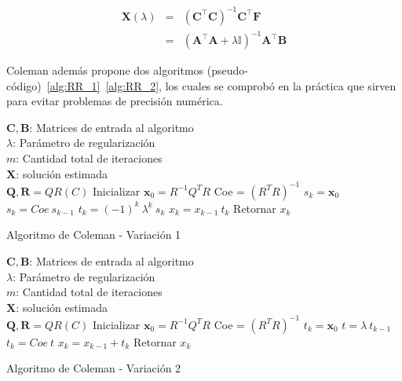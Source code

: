 \begin{eqnarray*}
\mathbf{X}(\lambda)&=&(\mathbf{C}^\top
\mathbf{C})^{-1}\mathbf{C}^\top \mathbf{F} \\
&=& (\mathbf{A}^\top \mathbf{A} + \lambda \mathbb{I})^{-1} \mathbf{A}^\top \mathbf{B}
\end{eqnarray*}

Coleman además propone dos algoritmos
(pseudo-código)~\ref{alg:RR_1}~\ref{alg:RR_2}, los cuales se comprobó en la
práctica que sirven para evitar problemas de precisión numérica.

\begin{algorithm}[H]
\begin{algorithmic}[1]
\REQUIRE $\,$ \\
$\mathbf{C},\mathbf{B}$: Matrices de entrada al algoritmo \\
$\lambda$: Parámetro de regularización \\
$m$: Cantidad total de iteraciones \\
\ENSURE $\,$\\
$\mathbf{X}$: solución estimada \\
\STATE $\mathbf{Q}, \mathbf{R} = QR(C)$
\STATE Inicializar $\mathbf{x}_0 = R^{-1} Q^T R$
\STATE Coe = $(R^T R)^{-1}$
\STATE $s_k = \mathbf{x}_0 $
    \STATE $s_k = Coe ~ s_{k-1}$   
    \STATE $t_k = (-1)^k ~ \lambda^k ~ s_k$
    \STATE $x_k = x_{k-1} ~ t_k$
\ENDFOR
\STATE Retornar $x_k$
\end{algorithmic}
\caption{Algoritmo de Coleman - Variación 1}
\label{alg:RR_1}
\end{algorithm}

\begin{algorithm}[H]
\begin{algorithmic}[1]
\REQUIRE $\,$ \\
$\mathbf{C},\mathbf{B}$: Matrices de entrada al algoritmo \\
$\lambda$: Parámetro de regularización \\
$m$: Cantidad total de iteraciones \\
\ENSURE $\,$\\
$\mathbf{X}$: solución estimada \\
\STATE $\mathbf{Q}, \mathbf{R} = QR(C)$
\STATE Inicializar $\mathbf{x}_0 = R^{-1} Q^T R$
\STATE Coe = $(R^T R)^{-1}$
\STATE $t_k = \mathbf{x}_0 $
    \STATE $t = \lambda ~ t_{k-1}$   
    \STATE $t_k = Coe ~ t$
    \STATE $x_k = x_{k-1} + t_k$
\ENDFOR
\STATE Retornar $x_k$
\end{algorithmic}
\caption{Algoritmo de Coleman - Variación 2}
\label{alg:RR_2}
\end{algorithm}
